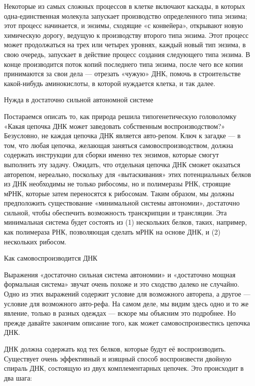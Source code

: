 \documentclass[../main.tex]{subfiles}
\begin{document}
Некоторые из самых сложных процессов в клетке включают каскады, в которых одна-единственная молекула запускает производство определенного типа энзима; этот процесс начинается, и энзимы, сходящие «с конвейера», открывают новую химическую дорогу, ведущую к производству второго типа энзима. Этот процесс может продолжаться на трех или четырех уровнях, каждый новый тип энзима, в свою очередь, запускает в действие процесс создания следующего типа энзима. В конце производится поток копий последнего типа энзима, после чего все копии принимаются за свои дела --- отрезать «чужую» ДНК, помочь в строительстве какой-нибудь аминокислоты, в которой нуждается клетка, и так далее.

Нужда в достаточно сильной автономной системе

Постараемся описать то, как природа решила типогенетическую головоломку «Какая цепочка ДНК может заведовать собственным воспроизводством?» Безусловно, не каждая цепочка ДНК является авто-репом. Ключ к загадке --- в том, что любая цепочка, желающая заняться самовоспроизводством, должна содержать инструкции для сборки именно тех энзимов, которые смогут выполнить эту задачу. Ожидать, что отдельная цепочка ДНК сможет оказаться авторепом, нереально, поскольку для «вытаскивания» этих потенциальных белков из ДНК необходимы не только рибосомы, но и полимеразы РНК, строящие мРНК, которые затем переносятся к рибосомам. Таким образом, мы должны предположить существование «минимальной системы автономии», достаточно сильной, чтобы обеспечить возможность транскрипции и трансляции. Эта минимальная система будет состоять из (1) нескольких белков, таких, например, как полимераза РНК, позволяющая сделать мРНК на основе ДНК, и (2) нескольких рибосом.

Как самовоспроизводится ДНК

Выражения «достаточно сильная система автономии» и «достаточно мощная формальная система» звучат очень похоже и это сходство далеко не случайно. Одно из этих выражений содержит условие для возможного авторепа, а другое --- условие для возможного авто-рефа. На самом деле, мы видим здесь одно и то же явление, только в разных одеждах --- вскоре мы объясним это подробнее. Но прежде давайте закончим описание того, как может самовоспроизвестись цепочка ДНК.

ДНК должна содержать код тех белков, которые будут её воспроизводить. Существует очень эффективный и изящный способ воспроизвести двойную спираль ДНК, состоящую из двух комплементарных цепочек. Это происходит в два шага:
\end{document}
